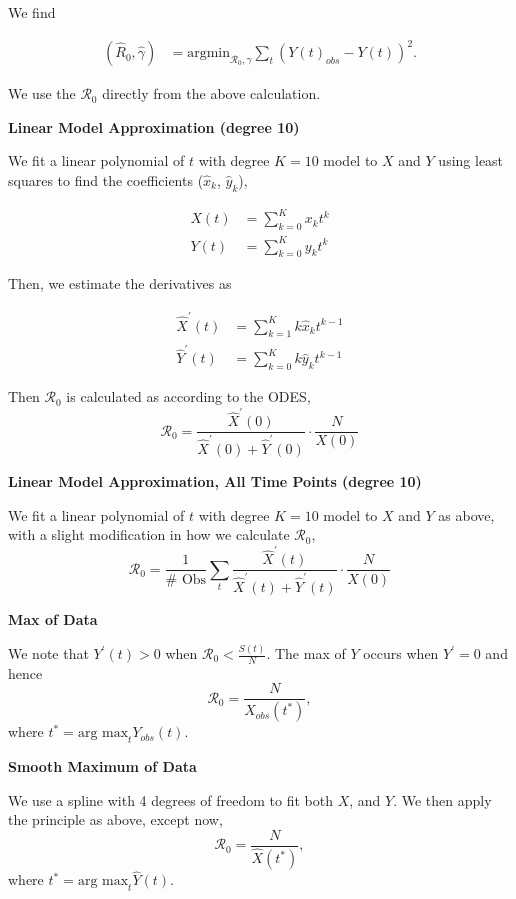 \documentclass[12pt]{article}
\newcommand{\rr}{\ensuremath{\mathcal{R}_0}}
\begin{document}
We find

\begin{align*}
(\hat{R}_0, \hat{\gamma} )&=\text{argmin}_{\rr, \gamma} \sum_{t} (Y(t)_{obs} - Y(t))^2 .
\end{align*}

We use the \(\rr\) directly from the above calculation.

\textbf{Linear Model Approximation (degree
10)}\label{linear-model-approximation-degree-10}

We fit a linear polynomial of \(t\) with degree \(K= 10\) model to \(X\)
and \(Y\) using least squares to find the coefficients (\(\hat{x}_k\),
\(\hat{y}_k\)),

\begin{align*}
X(t) &= \sum_{k=0}^K x_k t^k\\
{Y}(t) &= \sum_{k=0}^K y_k t^k
\end{align*}

Then, we estimate the derivatives as

\begin{align*}
\hat{X}^\prime(t) &= \sum_{k=1}^K k \hat{x}_k t^{k-1}\\
\hat{Y}^\prime(t) &= \sum_{k=0}^K k \hat{y}_k t^{k-1}
\end{align*}

Then \(\rr\) is calculated as according to the ODES,
\[\rr = \frac{\hat{X}^\prime(0)}{ \hat{X}^\prime(0) + \hat{Y}^\prime(0)} \cdot \frac{N}{X(0)} \]

\textbf{Linear Model Approximation, All Time Points (degree
10)}\label{linear-model-approximation-all-time-points-degree-10}

We fit a linear polynomial of \(t\) with degree \(K= 10\) model to \(X\)
and \(Y\) as above, with a slight modification in how we calculate
\(\rr\),
\[\rr = \frac{1}{\# \text{ Obs}}\sum_t \frac{\hat{X}^\prime(t)}{ \hat{X}^\prime(t) + \hat{Y}^\prime(t)} \cdot \frac{N}{X(0)} \]

\textbf{Max of Data}\label{max-of-data}

We note that \(Y^\prime(t) > 0\) when \(\rr < \frac{S(t)}{N}\). The max
of \(Y\) occurs when \(Y^\prime = 0\) and hence
\[\rr = \frac{N}{X_{obs}(t^*)},\] where
\(t^* = \text{arg max}_{t} Y_{obs}(t)\).

\textbf{Smooth Maximum of Data}\label{smooth-maximum-of-data}

We use a spline with 4 degrees of freedom to fit both \(X\), and \(Y\).
We then apply the principle as above, except now,
\[\rr = \frac{N}{\hat{X}(t^*)},\] where
\(t^* = \text{arg max}_{t} \hat{Y}(t)\).
\end{document}
